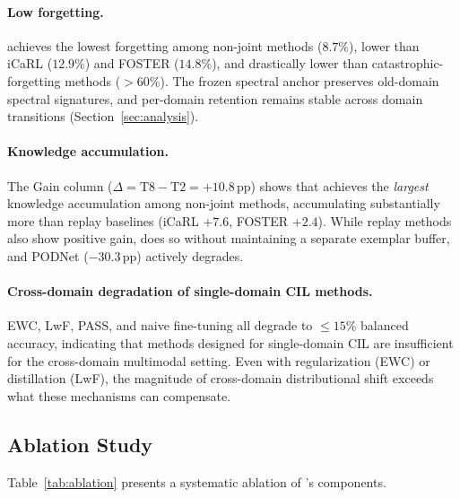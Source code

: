 \paragraph{Low forgetting.}
\methodname{} achieves the lowest forgetting among non-joint methods ($8.7\%$), lower than iCaRL ($12.9\%$) and FOSTER ($14.8\%$), and drastically lower than catastrophic-forgetting methods ($>60\%$).
The frozen spectral anchor preserves old-domain spectral signatures, and per-domain retention remains stable across domain transitions (Section~\ref{sec:analysis}).

\paragraph{Knowledge accumulation.}
The Gain column ($\Delta = \mathrm{T8} - \mathrm{T2} = +10.8$\,pp) shows that \methodname{} achieves the \emph{largest} knowledge accumulation among non-joint methods, accumulating substantially more than replay baselines (iCaRL $+7.6$, FOSTER $+2.4$).
While replay methods also show positive gain, \methodname{} does so without maintaining a separate exemplar buffer, and PODNet ($-30.3$\,pp) actively degrades.

\paragraph{Cross-domain degradation of single-domain CIL methods.}
EWC, LwF, PASS, and naive fine-tuning all degrade to $\leq 15\%$ balanced accuracy, indicating that methods designed for single-domain CIL are insufficient for the cross-domain multimodal setting.
Even with regularization (EWC) or distillation (LwF), the magnitude of cross-domain distributional shift exceeds what these mechanisms can compensate.

\subsection{Ablation Study}
\label{sec:ablation}

Table~\ref{tab:ablation} presents a systematic ablation of \methodname{}'s components.



